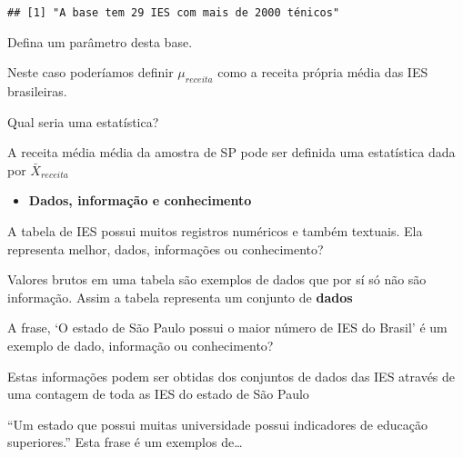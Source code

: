 \documentclass[12pt,]{style/krantz}
\providecommand{\tightlist}{%
  \setlength{\itemsep}{0pt}\setlength{\parskip}{0pt}}
\theoremstyle{definition}
\theoremstyle{definition}
\theoremstyle{definition}
\theoremstyle{remark}
\let\BeginKnitrBlock\begin \let\EndKnitrBlock\end
\begin{document}
\begin{verbatim}
## [1] "A base tem 29 IES com mais de 2000 ténicos"
\end{verbatim}

\BeginKnitrBlock{exercise}
\protect\hypertarget{exr:unnamed-chunk-12}{}{\label{exr:unnamed-chunk-12}
}Defina um parâmetro desta base.
\EndKnitrBlock{exercise}

\BeginKnitrBlock{solution}
\iffalse{} {Solução. } \fi{}Neste caso poderíamos definir
\(\mu_{receita}\) como a receita própria média das IES brasileiras.
\EndKnitrBlock{solution}

\BeginKnitrBlock{exercise}
\protect\hypertarget{exr:unnamed-chunk-14}{}{\label{exr:unnamed-chunk-14}
}Qual seria uma estatística?
\EndKnitrBlock{exercise}

\BeginKnitrBlock{solution}
\iffalse{} {Solução. } \fi{}A receita média média da amostra de SP pode
ser definida uma estatística dada por \(\bar X_{receita}\)
\EndKnitrBlock{solution}

\begin{itemize}
\tightlist
\item
  \textbf{Dados, informação e conhecimento}
\end{itemize}

\BeginKnitrBlock{exercise}
\protect\hypertarget{exr:unnamed-chunk-16}{}{\label{exr:unnamed-chunk-16} }A
tabela de IES possui muitos registros numéricos e também textuais. Ela
representa melhor, dados, informações ou conhecimento?
\EndKnitrBlock{exercise}

\BeginKnitrBlock{solution}
\iffalse{} {Solução. } \fi{}Valores brutos em uma tabela são exemplos de
dados que por sí só não são informação. Assim a tabela representa um
conjunto de \textbf{dados}
\EndKnitrBlock{solution}

\BeginKnitrBlock{exercise}
\protect\hypertarget{exr:unnamed-chunk-18}{}{\label{exr:unnamed-chunk-18} }A
frase, `O estado de São Paulo possui o maior número de IES do Brasil' é
um exemplo de dado, informação ou conhecimento?
\EndKnitrBlock{exercise}

\BeginKnitrBlock{solution}
\iffalse{} {Solução. } \fi{}Estas informações podem ser obtidas dos
conjuntos de dados das IES através de uma contagem de toda as IES do
estado de São Paulo
\EndKnitrBlock{solution}

\BeginKnitrBlock{exercise}
\protect\hypertarget{exr:unnamed-chunk-20}{}{\label{exr:unnamed-chunk-20}
}``Um estado que possui muitas universidade possui indicadores de
educação superiores.'' Esta frase é um exemplos de\ldots{}
\EndKnitrBlock{exercise}
\end{document}
